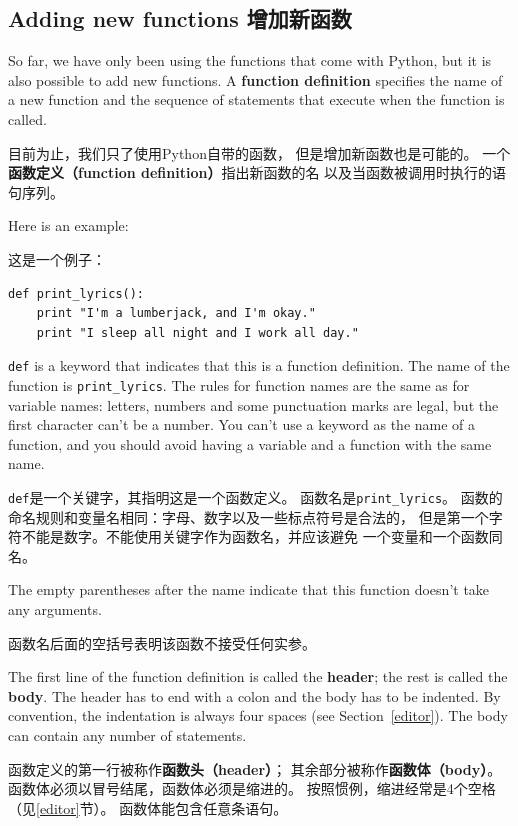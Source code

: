 \documentclass[10pt]{book}
\begin{document}
\begin{CJK}{UTF8}{gbsn}
\section{Adding new functions 增加新函数}

So far, we have only been using the functions that come with Python,
but it is also possible to add new functions.
A {\bf function definition} specifies the name of a new function and
the sequence of statements that execute when the function is called.

目前为止，我们只了使用Python自带的函数，
但是增加新函数也是可能的。
一个{\bf 函数定义（function definition）}指出新函数的名
以及当函数被调用时执行的语句序列。

Here is an example:

这是一个例子：

\begin{verbatim}
def print_lyrics():
    print "I'm a lumberjack, and I'm okay."
    print "I sleep all night and I work all day."
\end{verbatim}
%
{\tt def} is a keyword that indicates that this is a function
definition.  The name of the function is \verb"print_lyrics".  The
rules for function names are the same as for variable names: letters,
numbers and some punctuation marks are legal, but the first character
can't be a number.  You can't use a keyword as the name of a function,
and you should avoid having a variable and a function with the same
name.

{\tt def}是一个关键字，其指明这是一个函数定义。
函数名是\verb"print_lyrics"。
函数的命名规则和变量名相同：字母、数字以及一些标点符号是合法的，
但是第一个字符不能是数字。不能使用关键字作为函数名，并应该避免
一个变量和一个函数同名。

The empty parentheses after the name indicate that this function
doesn't take any arguments.

函数名后面的空括号表明该函数不接受任何实参。

The first line of the function definition is called the {\bf header};
the rest is called the {\bf body}.  The header has to end with a colon
and the body has to be indented.  By convention, the indentation is
always four spaces (see Section~\ref{editor}).  The body can contain
any number of statements.

函数定义的第一行被称作{\bf 函数头（header）}；
其余部分被称作{\bf 函数体（body）}。
函数体必须以冒号结尾，函数体必须是缩进的。
按照惯例，缩进经常是4个空格（见\ref{editor}节）。
函数体能包含任意条语句。


\end{CJK}
\end{document}
